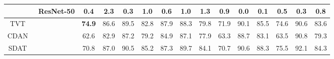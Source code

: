 \documentclass{article} \usepackage{iclr2023_conference,times}
\begin{document}
\begin{table}[t]
{\begin{tabular}{c|c|cccccccccccc|c}
       &   \multirow{-8}{*}{{\color{brown} ResNet-50}}    & 0.4  & 2.3  & 0.3  & 1.0  & 0.6  & 1.0  & 1.3  & 0.9  & 0.0  & 0.1  & 0.5  & 0.3  & 0.8                                                                                                            \\\midrule
TVT~\citep{yang2021tvt}             &                             & \textbf{74.9}                                                         & 86.6                                                         & 89.5                                                         & 82.8                                                & 87.9                                                         & 88.3                                                & 79.8                                                & 71.9                                                         & 90.1                                                         & 85.5                                                & 74.6                                                         & 90.6                                                         & 83.6                                                         \\
CDAN~\citep{long2018conditional}            &                             & 62.6                                                         & 82.9                                                         & 87.2                                                         & 79.2                                                & 84.9                                                         & 87.1                                                & 77.9                                                & 63.3                                                         & 88.7                                                         & 83.1                                                & 63.5                                                         & 90.8                                                         & 79.3                                                         \\
SDAT~\citep{rangwani2022closer}            &                             & 70.8                                                         & 87.0                                                         & 90.5                                                         & 85.2                                                & 87.3                                                         & 89.7                                                & 84.1                                                & 70.7                                                         & 90.6                                                         & 88.3                                                & 75.5                                                         & 92.1                                                         & 84.3                                                         \\

\end{tabular}}
\end{table}
\end{document}
